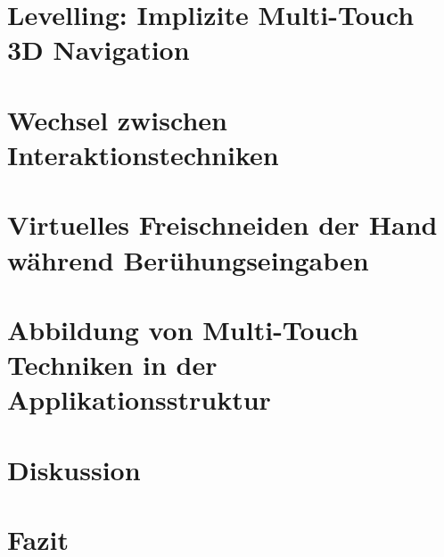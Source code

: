 \documentclass[pdftex,12pt,a4paper]{report}
\begin{document}

\chapter{Levelling: Implizite Multi-Touch 3D Navigation}
\label{chp:implizite_navigation}



\chapter{Wechsel zwischen Interaktionstechniken}
\label{chp:wechsel_zwischen_interaktionstechniken}



\chapter{Virtuelles Freischneiden der Hand während Berühungseingaben}
\label{chp:freischneiden}



\chapter{Abbildung von Multi-Touch Techniken in der Applikationsstruktur}
\label{chp:applikationsstruktur}



\chapter{Diskussion}
\label{chp:diskussion}



\chapter{Fazit}
\label{chp:fazit}



\end{document}
